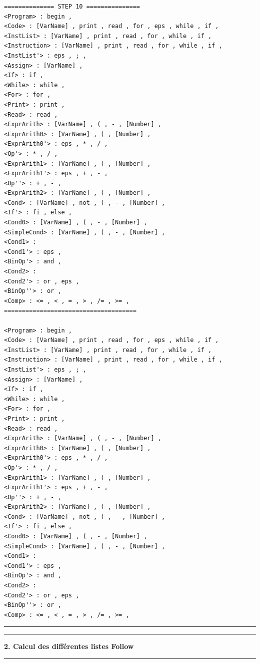 \documentclass[pdftex,10pt,a4paper]{article}
\begin{document}
\begin{lstlisting}[breaklines]
============== STEP 10 ===============
<Program> : begin , 
<Code> : [VarName] , print , read , for , eps , while , if , 
<InstList> : [VarName] , print , read , for , while , if , 
<Instruction> : [VarName] , print , read , for , while , if , 
<InstList'> : eps , ; , 
<Assign> : [VarName] , 
<If> : if , 
<While> : while , 
<For> : for , 
<Print> : print , 
<Read> : read , 
<ExprArith> : [VarName] , ( , - , [Number] , 
<ExprArith0> : [VarName] , ( , [Number] , 
<ExprArith0'> : eps , * , / , 
<Op'> : * , / , 
<ExprArith1> : [VarName] , ( , [Number] , 
<ExprArith1'> : eps , + , - , 
<Op''> : + , - , 
<ExprArith2> : [VarName] , ( , [Number] , 
<Cond> : [VarName] , not , ( , - , [Number] , 
<If'> : fi , else , 
<Cond0> : [VarName] , ( , - , [Number] , 
<SimpleCond> : [VarName] , ( , - , [Number] , 
<Cond1> : 
<Cond1'> : eps , 
<BinOp'> : and , 
<Cond2> : 
<Cond2'> : or , eps , 
<BinOp''> : or , 
<Comp> : <= , < , = , > , /= , >= , 
=====================================

<Program> : begin , 
<Code> : [VarName] , print , read , for , eps , while , if , 
<InstList> : [VarName] , print , read , for , while , if , 
<Instruction> : [VarName] , print , read , for , while , if , 
<InstList'> : eps , ; , 
<Assign> : [VarName] , 
<If> : if , 
<While> : while , 
<For> : for , 
<Print> : print , 
<Read> : read , 
<ExprArith> : [VarName] , ( , - , [Number] , 
<ExprArith0> : [VarName] , ( , [Number] , 
<ExprArith0'> : eps , * , / , 
<Op'> : * , / , 
<ExprArith1> : [VarName] , ( , [Number] , 
<ExprArith1'> : eps , + , - , 
<Op''> : + , - , 
<ExprArith2> : [VarName] , ( , [Number] , 
<Cond> : [VarName] , not , ( , - , [Number] , 
<If'> : fi , else , 
<Cond0> : [VarName] , ( , - , [Number] , 
<SimpleCond> : [VarName] , ( , - , [Number] , 
<Cond1> : 
<Cond1'> : eps , 
<BinOp'> : and , 
<Cond2> : 
<Cond2'> : or , eps , 
<BinOp''> : or , 
<Comp> : <= , < , = , > , /= , >= , 
\end{lstlisting}

\noindent\rule[0.5ex]{\linewidth}{1pt}


\noindent\rule[0.5ex]{\linewidth}{1pt}
\textbf{2. Calcul des différentes listes Follow}\\
\noindent\rule[0.5ex]{\linewidth}{1pt}
\end{document}
